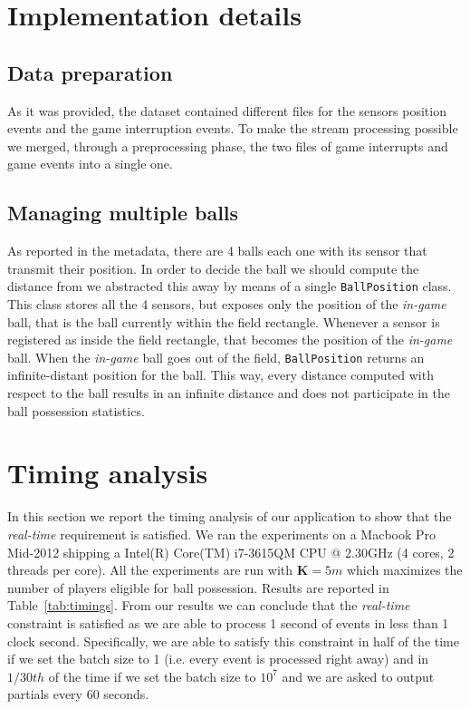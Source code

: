 \documentclass[a4paper, 11pt]{article}
\begin{document}
\begin{multicols}{2}
\section{Implementation details}
\subsection{Data preparation}
As it was provided, the dataset contained different files for the sensors position events and the game interruption events. To make the stream processing possible we merged, through a preprocessing phase, the two files of game interrupts and game events into a single one. 
\subsection{Managing multiple balls}
As reported in the metadata, there are 4 balls each one with its sensor that transmit their position. In order to decide the ball we should compute the distance from we abstracted this away by means of a single \texttt{BallPosition} class. This class stores all the 4 sensors, but exposes only the position of the \textit{in-game} ball, that is the ball currently within the field rectangle. Whenever a sensor is registered as inside the field rectangle, that becomes the position of the \textit{in-game} ball. When the \textit{in-game} ball goes out of the field, \texttt{BallPosition} returns an infinite-distant position for the ball. This way, every distance computed with respect to the ball results in an infinite distance and does not participate in the ball possession statistics.

\section{Timing analysis}
In this section we report the timing analysis of our application to show that the \textit{real-time} requirement is satisfied. We ran the experiments on a Macbook Pro Mid-2012 shipping a Intel(R) Core(TM) i7-3615QM CPU @ 2.30GHz (4 cores, 2 threads per core). All the experiments are run with $\mathbf{K} = 5 m$ which maximizes the number of players eligible for ball possession. Results are reported in Table~\ref{tab:timings}. From our results we can conclude that the \textit{real-time} constraint is satisfied as we are able to process 1 second of events in less than 1 clock second. Specifically, we are able to satisfy this constraint in half of the time if we set the batch size to 1 (i.e. every event is processed right away) and in $1 / 30th$ of the time if we set the batch size to $10^7$ and we are asked to output partials every 60 seconds.


\end{multicols}
\end{document}
